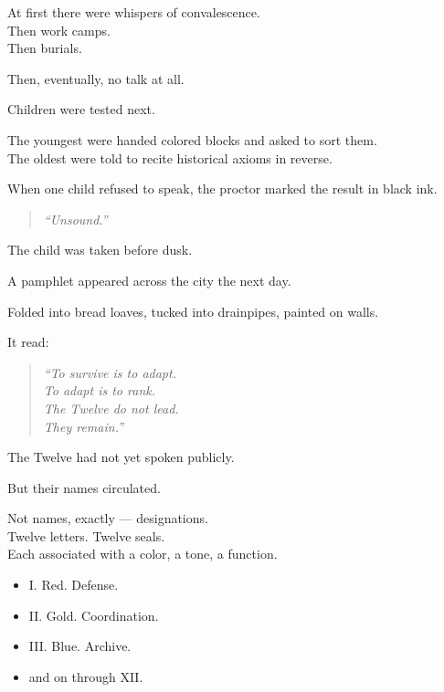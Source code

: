 \documentclass[12pt]{article}
\begin{document}
At first there were whispers of convalescence.\\
Then work camps.\\
Then burials.

Then, eventually, no talk at all.

\vspace{1em}

Children were tested next.

The youngest were handed colored blocks and asked to sort them.\\
The oldest were told to recite historical axioms in reverse.

When one child refused to speak, the proctor marked the result in black ink.

\begin{quote}
\textit{“Unsound.”}
\end{quote}

The child was taken before dusk.

\vspace{1em}

A pamphlet appeared across the city the next day.

Folded into bread loaves, tucked into drainpipes, painted on walls.

It read:

\begin{quote}
\textit{“To survive is to adapt.}\\
\textit{To adapt is to rank.}\\
\textit{The Twelve do not lead.}\\
\textit{They remain.”}
\end{quote}

\vspace{1em}

The Twelve had not yet spoken publicly.

But their names circulated.

Not names, exactly — designations.\\
Twelve letters. Twelve seals.\\
Each associated with a color, a tone, a function.

\begin{itemize}
    \item I. Red. Defense.
    \item II. Gold. Coordination.
    \item III. Blue. Archive.
    \item \textellipsis{} and on through XII.
\end{itemize}
\end{document}
